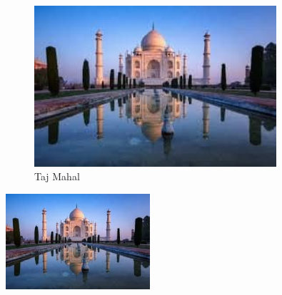 \documentclass{article}
\begin{document}
	
	
	\begin{figure}[h!]											%
		\centering												%
		\includegraphics[width=0.8\textwidth]{images/taj.jpg}   %
		\caption{Taj Mahal}										%
		\label{taj}												%
	\end{figure}

	\includegraphics[width=0.4\textwidth]{images/taj.jpg}\\  
	

\end{document}
